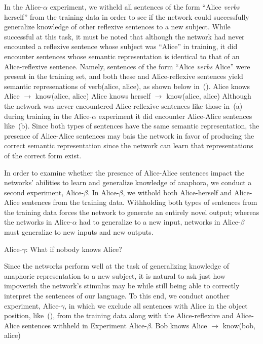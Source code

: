 In the Alice-$\alpha$ experiment, we witheld all sentences of the form ``Alice 
{\it verbs} herself'' from the training data in order to see if the network
could successfully generalize knowledge of other reflexive sentences to a new
subject. While successful at this task, it must be noted that although the 
network had never encounted a reflexive sentence whose subject was ``Alice''
in training, it did encounter sentences whose semantic representation is 
identical to that of an Alice-reflexive sentence. Namely, sentences of the form
``Alice {\it verbs} Alice'' were present in the training set, and both these
and Alice-reflexive sentences yield semantic represenations of 
verb(alice, alice), as shown below in~(\nextx).
\pex
	\a Alice knows Alice $\to$ know(alice, alice)
	\a Alice knows herself $\to$ know(alice, alice)
\xe
Although the network was never encountered Alice-reflexive sentences like
those in~(\lastx a) during training in the Alice-$\alpha$ experiment it did encounter Alice-Alice sentences 
like~(\lastx b). Since both types of sentences have the same semantic 
representation, the presence of Alice-Alice sentences may bais the network in
favor of producing the correct semantic representation since the network can
learn that representations of the correct form exist.

In order to examine whether the presence of Alice-Alice sentences impact the
networks' abilities to learn and generalize knowledge of anaphora, we conduct
a second experiment, Alice-$\beta$. In Alice-$\beta$, we withold both 
Alice-herself and Alice-Alice sentences from the training data.
Withholding both types of sentences from the training data
forces the network to generate an entirely novel output; whereas the networks
in Alice-$\alpha$ had to generalize to a new input, networks in Alice-$\beta$
must generalize to new inputs and new outputs.

\ssec Alice-$\gamma$: What if nobody knows Alice?

Since the networks perform well at the task of generalizing knowledge of 
anaphoric representation to a new subject, it is natural to ask just how 
impoverish the network's stimulus may be while still being able to correctly
interpret the sentences of our language. To this end, we conduct another 
experiment, Alice-$\gamma$, in which we exclude all sentences with Alice in 
the object position, like~(\nextx), from the training data along with the 
Alice-reflexive and Alice-Alice sentences withheld in Experiment Alice-$\beta$.
\ex
	Bob knows Alice $\to$ know(bob, alice)
\xe

